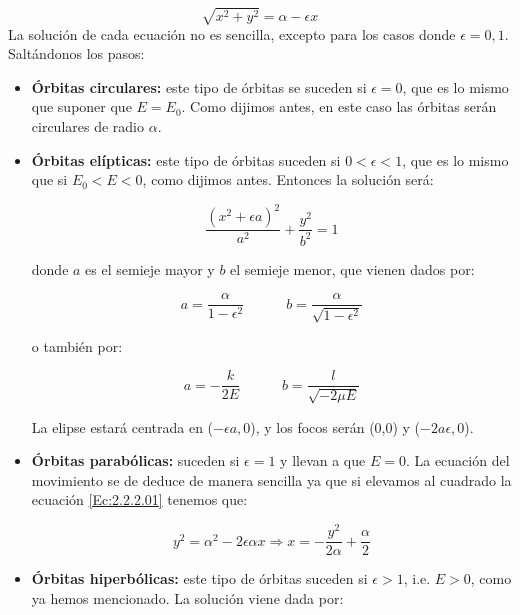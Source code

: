\documentclass[12pt,a4paper]{book}
\begin{document}
\begin{equation}
\sqrt{x^2+y^2} = \alpha - \epsilon x \label{Ec:2.2.4.01}
\end{equation}
La solución de cada ecuación no es sencilla, excepto para los casos donde $\epsilon = 0,1$. Saltándonos los pasos:

\begin{itemize}
\item \textbf{Órbitas circulares:} este tipo de órbitas se suceden si $\epsilon=0$, que es lo mismo que suponer que $E=E_0$. Como dijimos antes, en este caso las órbitas serán circulares de radio $\alpha$. 

\item \textbf{Órbitas elípticas:} este tipo de órbitas suceden si $0<\epsilon<1$, que es lo mismo que si $E_0 < E < 0$, como dijimos antes. Entonces la solución será:

\begin{equation}
\dfrac{(x^2 + \epsilon a)^2}{a^2} + \dfrac{y^2}{b^2} = 1
\end{equation}

donde $a$ es el semieje mayor y $b$ el semieje menor, que vienen dados por:

\begin{equation}
a = \dfrac{\alpha}{1-\epsilon^2} \quad \quad \quad b = \dfrac{\alpha}{\sqrt{1-\epsilon^2}}
\end{equation}

o también por:

\begin{equation}
a = - \dfrac{k}{2E} \quad \quad \quad b = \dfrac{l}{\sqrt{-2 \mu E}}
\end{equation}

La elipse estará centrada en ($ -\epsilon a, 0 $), y los focos serán (0,0) y ($-2a\epsilon,0$).

\item \textbf{Órbitas parabólicas:} suceden si $\epsilon = 1$ y llevan a que $E=0$. La ecuación del movimiento se de deduce de manera sencilla ya que si elevamos al cuadrado la ecuación \ref{Ec:2.2.2.01} tenemos que:

\begin{equation}
y^2 = \alpha^2 - 2 \epsilon \alpha x \Longrightarrow x = - \dfrac{y^2}{2 \alpha} + \dfrac{\alpha}{2}
\end{equation}

\item \textbf{Órbitas hiperbólicas:} este tipo de órbitas suceden si $\epsilon>1$, i.e. $E>0$, como ya hemos mencionado. La solución viene dada por: 


\end{itemize}
\end{document}
